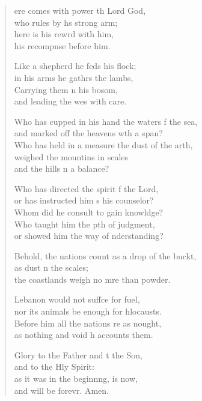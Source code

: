 \begin{verse}
  \begin{patverse}
ere comes with power th Lord God,\Med\\
who rules by h\pointup{\i}s strong arm;\\
here is his rewrd with him,\Med\\
his recompnse before him.

Like a shepherd he feds his flock;\Med\\
in his arms he gathrs the lambs,\\
Carrying them \pointup{\i}n his bosom,\Med\\
and leading the wes with care.

Who has cupped in his hand the waters f the sea,\Med\\
and marked off the heavens w\pointup{\i}th a span?\\
Who has held in a measure the dust of the arth,\Flex\\
weighed the mountins in scales\Med\\
and the hills \pointup{\i}n a balance?

Who has directed the spirit f the Lord,\Med\\
or has instructed him s his counselor?\\
Whom did he consult to gain knowldge?\Flex\\
Who taught him the pth of judgment,\Med\\
or showed him the way of nderstanding?

Behold, the nations count as a drop of the buckt,\Flex\\
as dust n the scales;\Med\\
the coastlands weigh no mre than powder.

Lebanon would not suff\pointup{\i}ce for fuel,\Med\\
nor its animals be enough for hlocausts.\\
Before him all the nations re as nought,\Med\\
as nothing and void h accounts them.

Glory to the Father and t the Son,\Med\\
and to the Hly Spirit:\\
as it was in the beginn\pointup{\i}ng, is now,\Med\\
and will be forevr. Amen.
  \end{patverse}
\end{verse}
